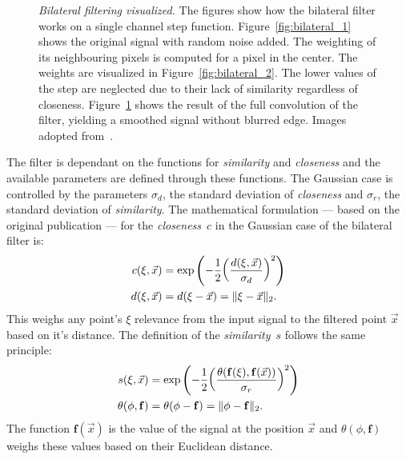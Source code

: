\begin{figure}[b!]
\begin{subfigure}[b]{0.3\linewidth}
        \caption{}\label{fig:bilateral_3}
    \end{subfigure}
    \caption[Bilateral filtering visualized]{\emph{Bilateral filtering visualized.} The figures show how the bilateral filter works on a single channel step function. Figure~\ref{fig:bilateral_1} shows the original signal with random noise added. The weighting of its neighbouring pixels is computed for a pixel in the center. The weights are visualized in Figure~\ref{fig:bilateral_2}. The lower values of the step are neglected due to their lack of similarity regardless of closeness. Figure~\ref{fig:bilateral_3} shows the result of the full convolution of the filter, yielding a smoothed signal without blurred edge. Images adopted from~\cite{tomasi_iccv98}.}\label{fig:bilateral_filter}
\end{figure}
The filter is dependant on the functions for \emph{similarity} and \emph{closeness} and the available parameters are defined through these functions.
The Gaussian case is controlled by the parameters $\sigma_d$, the standard deviation of \emph{closeness} and $\sigma_r$, the standard deviation of \emph{similarity}.
The mathematical formulation --- based on the original publication\cite{tomasi_iccv98} --- for the \emph{closeness}~$c$ in the Gaussian case of the bilateral filter is:
\begin{equation}
\begin{aligned}
    c(\xi, \vec{x})&= \exp\left(-\frac{1}{2}{\left(\frac{d(\xi, \vec{x})}{\sigma_d} \right)}^2 \right) \\
    d(\xi, \vec{x})&= d(\xi - \vec{x}) = \lVert\xi - \vec{x}\rVert_{2} \text{.}
\end{aligned}
\end{equation}
This weighs any point's $\xi$ relevance from the input signal to the filtered point $\vec{x}$ based on it's distance.
The definition of the \emph{similarity}~$s$ follows the same principle:
\begin{equation}
\begin{aligned}
    s(\xi, \vec{x})&= \exp\left(-\frac{1}{2}{\left(\frac{\theta(\mathbf{f}(\xi), \mathbf{f}(\vec{x}))}{\sigma_r}\right)}^2\right) \\
    \theta(\phi, \mathbf{f})&= \theta(\phi - \mathbf{f}) = \lVert\phi - \mathbf{f}\rVert_{2}\text{.}
\end{aligned}
\end{equation}
The function $\mathbf{f}(\vec{x})$ is the value of the signal at the position $\vec{x}$ and $\theta(\phi, \mathbf{f})$ weighs these values based on their Euclidean distance.
